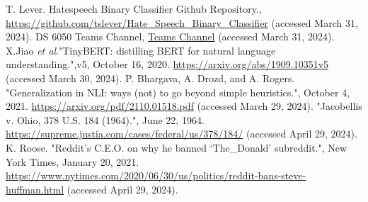 \documentclass[conference]{IEEEtran}
\begin{document}
\begin{thebibliography}{00}
 T. Lever. Hatespeech Binary Classifier Github Repository., \href{https://github.com/tslever/Hate_Speech_Binary_Classifier}{https://github.com/tslever/Hate_Speech_Binary_Classifier} (accessed March 31, 2024).
 DS 6050 Teams Channel, \href{https://myuva.sharepoint.com/:f:/s/DeepLearningProject197/EhqdcbyWnR1NmhQ6Ncn4oREBEb3JMQX6_L0OdURiePC_Vg?e=zbRngc}{Teams Channel} (accessed March 31, 2024).
X.Jiao \textit{et al}."TinyBERT: distilling BERT for natural language understanding.",v5, October 16, 2020. \href{https://arxiv.org/abs/1909.10351v5}{https://arxiv.org/abs/1909.10351v5} (accessed March 30, 2024). 
 P. Bhargava, A. Drozd, and A. Rogers. "Generalization in NLI: ways (not) to go beyond simple heuristics.", October 4, 2021. \href{https://arxiv.org/pdf/2110.01518.pdf}{https://arxiv.org/pdf/2110.01518.pdf} (accessed March 29, 2024). 
"Jacobellis v. Ohio, 378 U.S. 184 (1964).", June 22, 1964. \href{https://supreme.justia.com/cases/federal/us/378/184/}{https://supreme.justia.com/cases/federal/us/378/184/} (accessed April 29, 2024).
 K. Roose. "Reddit’s C.E.O. on why he banned ‘The_Donald’ subreddit.", New York Times, January 20, 2021. \href{https://www.nytimes.com/2020/06/30/us/politics/reddit-bans-steve-huffman.html}{https://www.nytimes.com/2020/06/30/us/politics/reddit-bans-steve-huffman.html} (accessed April 29, 2024).


\end{thebibliography}
\end{document}

